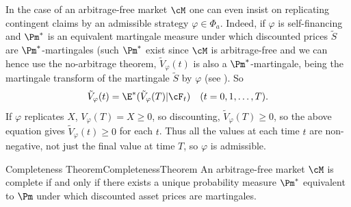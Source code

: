 In the case of an arbitrage-free market \(\cM\) one can even insist on replicating contingent claims by an admissible strategy \(\varphi \in \Phi_a\). Indeed, if \(\varphi\) is self-financing and \(\Pm^*\) is an equivalent martingale measure under which discounted prices \(\tilde{S}\) are \(\Pm^*\)-martingales (such \(\Pm^*\) exist since \(\cM\) is arbitrage-free and we can hence use the no-arbitrage theorem,  \(\tilde{V}_\varphi(t)\) is also a \(\Pm^*\)-martingale, being the martingale transform of the martingale \(\tilde{S}\) by \(\varphi\) (see ). So
\begin{equation}
	\tilde{V}_\varphi(t) = \E^ *(\tilde{V}_\varphi(T)|\cF_t) \quad (t=0,1,\dots,T).
\end{equation}
If \(\varphi\) replicates \(X\), \(V_\varphi(T) = X \ge 0\), so discounting, \(\tilde{V}_\varphi(T) \ge 0\), so the above equation gives \(\tilde{V}_\varphi(t) \ge 0\) for each \(t\). Thus all the values at each time \(t\) are non-negative, not just the final value at time \(T\), so \(\varphi\) is admissible.

\begin{thm}{Completeness Theorem}{CompletenessTheorem}
	An arbitrage-free market \(\cM\) is complete if and only if there exists a unique probability measure \(\Pm^*\) equivalent to \(\Pm\) under which discounted asset prices are martingales.
\end{thm}


